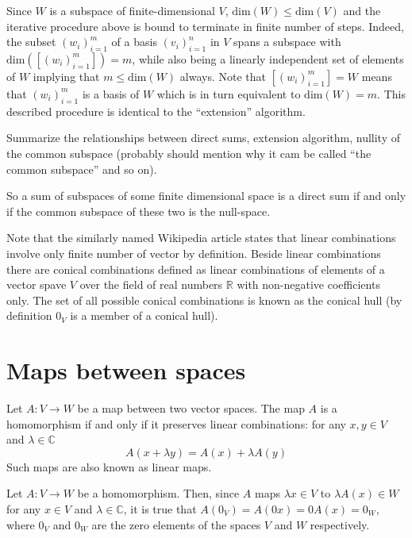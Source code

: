 \documentclass[a4paper]{article}
\newcommand{\brac}[1]{\ensuremath{\left( #1 \right)}}
\newcommand{\spn}[1]{\ensuremath{\left[ #1 \right]}}
\newcommand{\Dim}[1]{\ensuremath{\text{dim}\brac{ #1 }}}
\begin{document}
Since $W$ is a subspace of finite-dimensional $V$, $\Dim{W}\leq \Dim{V}$ and the iterative procedure above is bound to terminate in finite number of steps. Indeed, the subset $\brac{w_i}_{i=1}^m$ of a basis $\brac{v_i}_{i=1}^n$ in $V$ spans a subspace with $\Dim{\spn{\brac{w_i}_{i=1}^m}} = m$, while also being a linearly independent set of elements of $W$ implying that $m\leq \Dim{W}$ always. Note that $\spn{\brac{w_i}_{i=1}^m} = W$ means that $\brac{w_i}_{i=1}^m$ is a basis of $W$ which is in turn equivalent to $\Dim{W}=m$. This described procedure is identical to the ``extension'' algorithm.

Summarize the relationships between direct sums, extension algorithm, nullity of the common subspace (probably should mention why it cam be called ``the common subspace'' and so on).

So a sum of subspaces of some finite dimensional space is a direct sum if and only if the common subspace of these two is the null-space. 

Note that the similarly named Wikipedia article states that linear combinations involve only finite number of vector by definition. Beside linear combinations there are conical combinations defined as linear combinations of elements of a vector spave $V$ over the field of real numbers $\mathbb{R}$ with non-negative coefficients only. The set of all possible conical combinations is known as the conical hull (by definition $0_V$ is a member of a conical hull).



\section{Maps between spaces} %
\label{sec:maps_between_spaces}
Let $A:V\to W$ be a map between two vector spaces. The map $A$ is a homomorphism if and only if it preserves linear combinations: for any $x, y\in V$ and $\lambda \in \mathbb{C}$ \[A\brac{x + \lambda y} = A\brac{x} + \lambda A\brac{y}\] Such maps are also known as linear maps.

Let $A:V\to W$ be a homomorphism. Then, since $A$ maps $\lambda x \in V$ to $\lambda A\brac{x} \in W$ for any $x \in V$ and $\lambda \in \mathbb{C}$, it is true that $A\brac{0_V} = A\brac{0 x} = 0 A\brac{x} = 0_W$, where $0_V$ and $0_W$ are the zero elements of the spaces $V$ and $W$ respectively.
\end{document}
